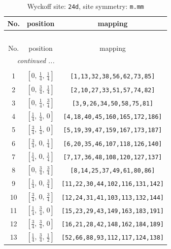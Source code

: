 \documentclass[fleqn,8pt]{jsarticle}
\begin{document}
\begin{longtable}{ccc}
\caption{Wyckoff site: {\tt 24d}, site symmetry: {\tt m.mm}}
 \\
 \hline \hline
No. & position & mapping \\ \hline \endfirsthead

\multicolumn{2}{l}{\tablename\ \thetable{}} \\
 \hline \hline
No. & position & mapping \\ \hline \endhead

 \hline \hline
\multicolumn{2}{r}{\footnotesize\it continued ...} \\ \endfoot

 \hline \hline
\multicolumn{2}{r}{} \\ \endlastfoot

1 & $\left[ 0,\, \frac{1}{4},\, \frac{1}{4} \right]$ & {\tt [1,13,32,38,56,62,73,85]} \\ \hline
2 & $\left[ 0,\, \frac{3}{4},\, \frac{1}{4} \right]$ & {\tt [2,10,27,33,51,57,74,82]} \\ \hline
3 & $\left[ 0,\, \frac{1}{4},\, \frac{3}{4} \right]$ & {\tt [3,9,26,34,50,58,75,81]} \\ \hline
4 & $\left[ \frac{1}{4},\, \frac{1}{4},\, 0 \right]$ & {\tt [4,18,40,45,160,165,172,186]} \\ \hline
5 & $\left[ \frac{3}{4},\, \frac{1}{4},\, 0 \right]$ & {\tt [5,19,39,47,159,167,173,187]} \\ \hline
6 & $\left[ \frac{3}{4},\, 0,\, \frac{1}{4} \right]$ & {\tt [6,20,35,46,107,118,126,140]} \\ \hline
7 & $\left[ \frac{1}{4},\, 0,\, \frac{1}{4} \right]$ & {\tt [7,17,36,48,108,120,127,137]} \\ \hline
8 & $\left[ 0,\, \frac{3}{4},\, \frac{3}{4} \right]$ & {\tt [8,14,25,37,49,61,80,86]} \\ \hline
9 & $\left[ \frac{1}{4},\, 0,\, \frac{3}{4} \right]$ & {\tt [11,22,30,44,102,116,131,142]} \\ \hline
10 & $\left[ \frac{3}{4},\, 0,\, \frac{3}{4} \right]$ & {\tt [12,24,31,41,103,113,132,144]} \\ \hline
11 & $\left[ \frac{1}{4},\, \frac{3}{4},\, 0 \right]$ & {\tt [15,23,29,43,149,163,183,191]} \\ \hline
12 & $\left[ \frac{3}{4},\, \frac{3}{4},\, 0 \right]$ & {\tt [16,21,28,42,148,162,184,189]} \\ \hline
13 & $\left[ \frac{1}{4},\, \frac{3}{4},\, \frac{1}{2} \right]$ & {\tt [52,66,88,93,112,117,124,138]} \\ \hline

\end{longtable}
\end{document}

